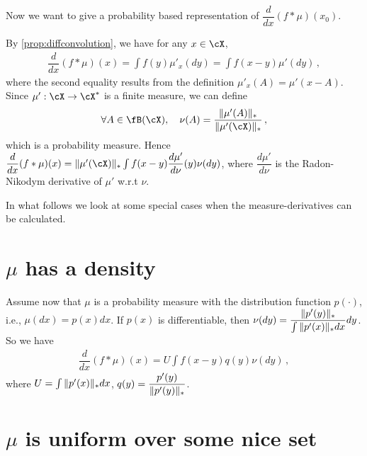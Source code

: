 \documentclass[11pt,letterpaper,english]{article}
\newcommand{\Borel}{\fB}
\begin{document}
Now we want to give a probability based representation of $\dfrac{d}{dx} (f*\mu) (x_0)$.

By \cref{prop:diffconvolution}, we have for any $x\in \cX$,
\begin{align*}
\dfrac{d}{dx} (f*\mu) (x) = \int f(y)\mu'_{x}(dy)
= \int f(x-y)\mu'(dy) \,,
\end{align*}
where the second equality results from the definition $\mu'_{x}(A)=\mu'(x-A)$. Since $\mu':\cX\to \cX^*$ is a finite measure, we can define 
\begin{align*}
\forall A \in \Borel(\cX), \quad
\nu(A) = \dfrac{\norm{\mu'(A)}_*}{\norm{\mu'(\cX)}_*}\,,
\end{align*}
which is a probability measure. Hence 
$\dfrac{d}{dx} (f*\mu) (x) = \norm{\mu'(\cX)}_* \int f(x-y) \dfrac{d\mu'}{d\nu}(y) \nu(dy)$, where $\dfrac{d\mu'}{d\nu}$ is the Radon-Nikodym derivative of $\mu'$ w.r.t $\nu$.

In what follows we look at some special cases when the measure-derivatives can be calculated.
\section{$\mu$ has a density}
Assume now that $\mu$ is a probability measure with the distribution function $p(\cdot)$, i.e., $\mu(dx) = p(x)dx$. If $p(x)$ is differentiable, then
$\nu(dy) = \dfrac{\|p'(y)\|_*}{\int \|p'(x)\|_*dx}dy$.
So we have
\begin{align*}
\dfrac{d}{dx} (f*\mu) (x) = U \int f(x-y) q(y) \nu (dy)\,,
\end{align*}
where $U = \int \|p'(x)\|_*dx$, $q(y) = \dfrac{p'(y)}{\|p'(y)\|_*}$.

\section{$\mu$ is uniform over some nice set}
\end{document}
